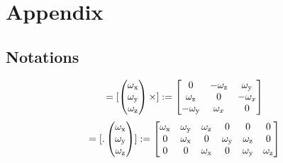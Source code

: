 

\chapter*{Appendix}
\label{appendix}
\vspace{1cm}

\section{Notations}
\begin{equation}
	[\vec{\omega} \times] = [\begin{pmatrix} \omega_\scr{x} \\ \omega_\scr{y} \\ \omega_\scr{z} \end{pmatrix} \times] := 
	\begin{bmatrix}
		0			& -\omega_\scr{z}	& \omega_\scr{y} \\
		\omega_\scr{z}	& 0			& -\omega_x \\
		-\omega_\scr{y}	& \omega_x	& 0
	\end{bmatrix}
\end{equation}
\begin{equation}
	[. \vec{\omega}] = [. \begin{pmatrix} \omega_\scr{x} \\ \omega_\scr{y} \\ \omega_\scr{z} \end{pmatrix}] :=
	\begin{bmatrix}
		\omega_\scr{x}	& \omega_\scr{y}	& \omega_\scr{z}	& 0			& 0			& 0 \\
		0			& \omega_\scr{x}	& 0			& \omega_\scr{y}	& \omega_\scr{z}	& 0 \\
		0			& 0			& \omega_\scr{x}	& 0			& \omega_\scr{y}	& \omega_\scr{z}
	\end{bmatrix}
\end{equation}